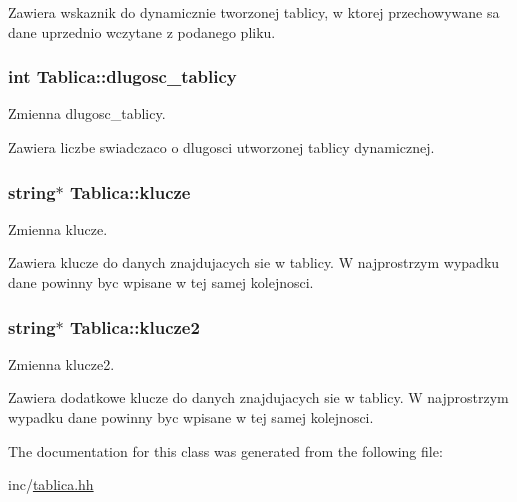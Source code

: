 Zawiera wskaznik do dynamicznie tworzonej tablicy, w ktorej przechowywane sa dane uprzednio wczytane z podanego pliku. \hypertarget{class_tablica_ab0d3e4210dc8a77e0f1c75834084c077}{
\subsubsection[{dlugosc\+\_\+tablicy}]{\setlength{\rightskip}{0pt plus 5cm}int Tablica\+::dlugosc\+\_\+tablicy}}\label{class_tablica_ab0d3e4210dc8a77e0f1c75834084c077}


Zmienna dlugosc\+\_\+tablicy. 

Zawiera liczbe swiadczaco o dlugosci utworzonej tablicy dynamicznej. \hypertarget{class_tablica_a86dbdede5dfd94c3ff34e35213ba4ff2}{
\subsubsection[{klucze}]{\setlength{\rightskip}{0pt plus 5cm}string$\ast$ Tablica\+::klucze}}\label{class_tablica_a86dbdede5dfd94c3ff34e35213ba4ff2}


Zmienna klucze. 

Zawiera klucze do danych znajdujacych sie w tablicy. W najprostrzym wypadku dane powinny byc wpisane w tej samej kolejnosci. \hypertarget{class_tablica_a0041da06aff5d015c4338414bfb1d48f}{
\subsubsection[{klucze2}]{\setlength{\rightskip}{0pt plus 5cm}string$\ast$ Tablica\+::klucze2}}\label{class_tablica_a0041da06aff5d015c4338414bfb1d48f}


Zmienna klucze2. 

Zawiera dodatkowe klucze do danych znajdujacych sie w tablicy. W najprostrzym wypadku dane powinny byc wpisane w tej samej kolejnosci. 

The documentation for this class was generated from the following file\+:\begin{DoxyCompactItemize}
\item 
inc/\hyperlink{tablica_8hh}{tablica.\+hh}\end{DoxyCompactItemize}

